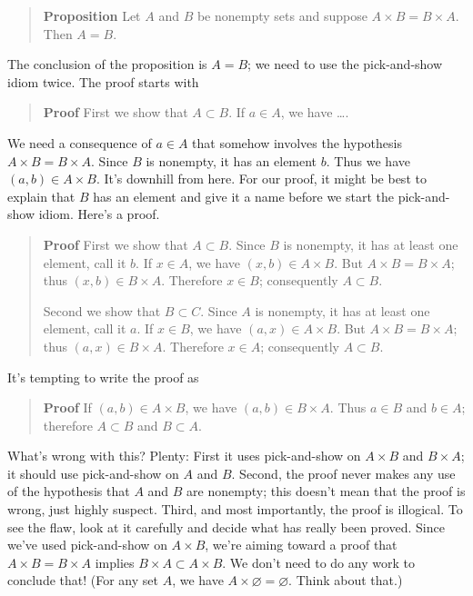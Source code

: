 \documentclass[12pt,fleqn]{article}
\newcounter{ex}\setcounter{ex}{0}
\newcounter{id}\setcounter{id}{0}
\newcounter{se}\setcounter{se}{0}
\begin{document}
\begin{quote}
\textbf{Proposition} Let \(A\) and \(B\) be nonempty sets and suppose \mbox{\(A \times B
= B \times A\)}.  Then \(A = B\).
\end{quote}
The conclusion of the proposition is \(A = B\); we need to use the 
pick-and-show idiom twice. The proof starts with
\begin{quote}
 \textbf{Proof}  First we show that \(A \subset B\). If \(a \in A\), we have \dots. 
\end{quote}
We need a consequence of \(a \in A\) that somehow involves the
hypothesis \mbox{\(A \times B = B \times A\)}.  Since \(B\) is
nonempty, it has an element \(b\). Thus we have \((a,b) \in A \times
B\).  It's downhill from here. For our proof, it might be best to
explain that \(B\) has an element and give it a name before we start
the pick-and-show idiom.  Here's a proof.



\begin{quote}
 \textbf{Proof} First we show that \(A \subset B\). Since \(B\) is
 nonempty, it has at least one element, call it \(b\). If \(x \in A\), we
 have \((x,b) \in A \times B\).  But \mbox{\(A \times B = B \times A\)};
 thus \((x,b) \in B \times A\).  Therefore \(x \in B\); consequently
\(A \subset B\).

Second we show that \(B \subset C\).  Since \(A\) is
 nonempty, it has at least one element, call it \(a\). If \(x \in B\), we
 have \((a,x) \in A \times B\).  But \(A \times B = B \times A\);
 thus \((a,x) \in B \times A\).  Therefore \(x \in A\); consequently
\(A \subset B\).

\end{quote}


It's tempting to write the proof as

\begin{quote}
 \textbf{Proof} If \((a,b) \in A \times B\), we have \((a,b) \in B \times
 A\). Thus \(a \in B\) and \(b \in A\); therefore \(A \subset B\) and
\(B \subset A\).
\end{quote}

What's wrong with this? Plenty: First it uses pick-and-show on \(A
\times B\) and \(B \times A\); it should use pick-and-show on \(A\)
and \(B\). Second, the proof never makes any use of the hypothesis
that \(A\) and \(B\) are nonempty; this doesn't mean that the proof is
wrong, just highly suspect. Third, and most importantly, the proof is
illogical. To see the flaw, look at it carefully and decide
what has really been proved. Since we've used pick-and-show on \(A
\times B\), we're aiming toward a proof that  \(A \times B = B
\times A\) implies \(B \times A \subset A \times B\).  We don't need
to do any work to conclude that! (For any set \(A\), we have \(A
\times \varnothing = \varnothing\). Think about that.)
\end{document}
